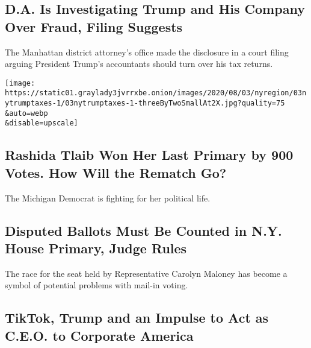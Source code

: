 \hypertarget{da-is-investigating-trump-and-his-company-over-fraud-filing-suggests}{%
\subsection{D.A. Is Investigating Trump and His Company Over Fraud,
Filing
Suggests}\label{da-is-investigating-trump-and-his-company-over-fraud-filing-suggests}}

The Manhattan district attorney's office made the disclosure in a court
filing arguing President Trump's accountants should turn over his tax
returns.

\href{/2020/08/03/nyregion/donald-trump-taxes-cyrus-vance.html}{}

\texttt{[image: https://static01.graylady3jvrrxbe.onion/images/2020/08/03/nyregion/03nytrumptaxes-1/03nytrumptaxes-1-threeByTwoSmallAt2X.jpg?quality=75\\\&auto=webp\\\&disable=upscale]}

\href{/2020/08/03/us/politics/michigan-primary-rashida-tlaib-brenda-jones.html}{}

\hypertarget{rashida-tlaib-won-her-last-primary-by-900-votes-how-will-the-rematch-go}{%
\subsection{Rashida Tlaib Won Her Last Primary by 900 Votes. How Will
the Rematch
Go?}\label{rashida-tlaib-won-her-last-primary-by-900-votes-how-will-the-rematch-go}}

The Michigan Democrat is fighting for her political life.

\href{/2020/08/03/nyregion/nyc-congress-carolyn-mahoney-ballots.html}{}

\hypertarget{disputed-ballots-must-be-counted-in-ny-house-primary-judge-rules}{%
\subsection{Disputed Ballots Must Be Counted in N.Y. House Primary,
Judge
Rules}\label{disputed-ballots-must-be-counted-in-ny-house-primary-judge-rules}}

The race for the seat held by Representative Carolyn Maloney has become
a symbol of potential problems with mail-in voting.

\href{/2020/08/03/business/economy/trump-tiktok-china-business.html}{}

\hypertarget{tiktok-trump-and-an-impulse-to-act-as-ceo-to-corporate-america}{%
\subsection{TikTok, Trump and an Impulse to Act as C.E.O. to Corporate
America}\label{tiktok-trump-and-an-impulse-to-act-as-ceo-to-corporate-america}}

